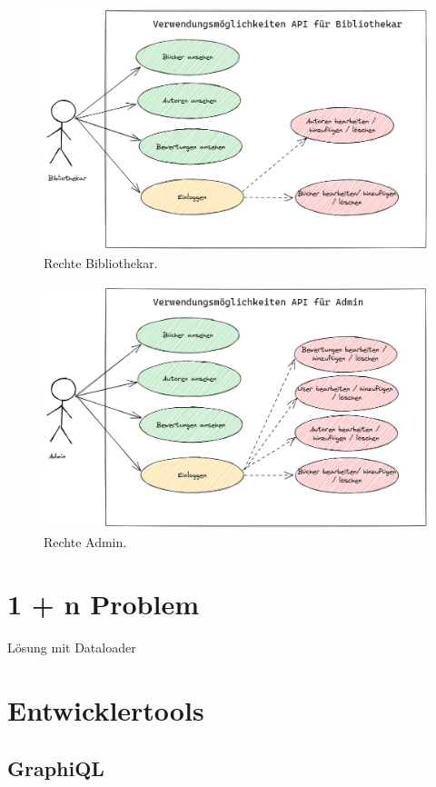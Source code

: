 \begin{figure}[H]
    \includegraphics[width=\textwidth]{pics/UseCaseLibrarian.png}
    \caption{Rechte Bibliothekar.}
\end{figure}

\begin{figure}[H]
    \includegraphics[width=\textwidth]{pics/UseCaseAdmin.png}
    \caption{Rechte Admin.}
\end{figure}

\section{1 + n Problem}
Lösung mit Dataloader
\section{Entwicklertools}
\subsection{GraphiQL}


